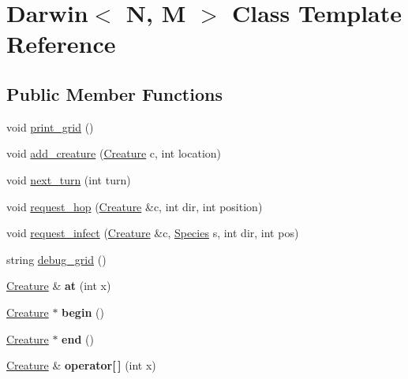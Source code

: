 \hypertarget{classDarwin}{\section{Darwin$<$ N, M $>$ Class Template Reference}
\label{classDarwin}
}
\subsection*{Public Member Functions}
\begin{DoxyCompactItemize}
\item 
void \hyperlink{classDarwin_a26fe32fb40e177792f46022774b0abe3}{print\-\_\-grid} ()
\item 
void \hyperlink{classDarwin_ad1615958f13b1cc66ab54df87a582e45}{add\-\_\-creature} (\hyperlink{classCreature}{Creature} c, int location)
\item 
void \hyperlink{classDarwin_ad6ccb751d1a17f5e6fa6dcc850ed06df}{next\-\_\-turn} (int turn)
\item 
void \hyperlink{classDarwin_a64e26d5a4dea520350c2e43e1aaebb57}{request\-\_\-hop} (\hyperlink{classCreature}{Creature} \&c, int dir, int position)
\item 
void \hyperlink{classDarwin_a700cab7603364e9b303d7ff81a91bd27}{request\-\_\-infect} (\hyperlink{classCreature}{Creature} \&c, \hyperlink{classSpecies}{Species} s, int dir, int pos)
\item 
string \hyperlink{classDarwin_ae4a599b99986c7c6be8ccf7822ba4add}{debug\-\_\-grid} ()
\item 
\hypertarget{classDarwin_a3a63ecb2e96fc8445ee9c39a2566c316}{\hyperlink{classCreature}{Creature} \& {\bfseries at} (int x)}\label{classDarwin_a3a63ecb2e96fc8445ee9c39a2566c316}

\item 
\hypertarget{classDarwin_a7d1afc96e75fbf8c50e7a50e8462effb}{\hyperlink{classCreature}{Creature} $\ast$ {\bfseries begin} ()}\label{classDarwin_a7d1afc96e75fbf8c50e7a50e8462effb}

\item 
\hypertarget{classDarwin_a772ed458b7b9571bf0b34a00c5b3bd33}{\hyperlink{classCreature}{Creature} $\ast$ {\bfseries end} ()}\label{classDarwin_a772ed458b7b9571bf0b34a00c5b3bd33}

\item 
\hypertarget{classDarwin_af5c2a1b330126c8c4988068b6575a8e8}{\hyperlink{classCreature}{Creature} \& {\bfseries operator\mbox{[}$\,$\mbox{]}} (int x)}\label{classDarwin_af5c2a1b330126c8c4988068b6575a8e8}

\end{DoxyCompactItemize}


